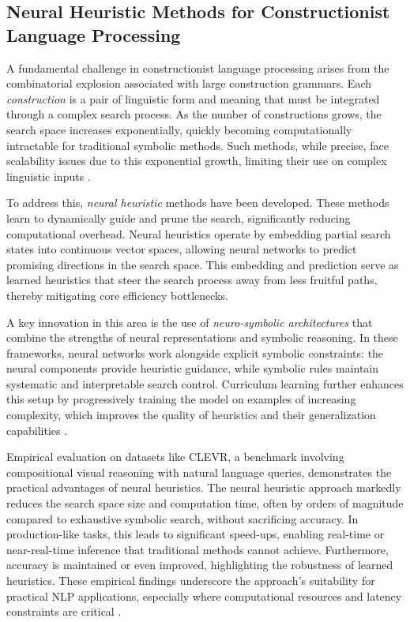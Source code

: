 \documentclass[sigconf]{acmart}
\begin{document}
\subsection{Neural Heuristic Methods for Constructionist Language Processing}

A fundamental challenge in constructionist language processing arises from the combinatorial explosion associated with large construction grammars. Each \emph{construction} is a pair of linguistic form and meaning that must be integrated through a complex search process. As the number of constructions grows, the search space increases exponentially, quickly becoming computationally intractable for traditional symbolic methods. Such methods, while precise, face scalability issues due to this exponential growth, limiting their use on complex linguistic inputs \cite{ref40}.

To address this, \emph{neural heuristic} methods have been developed. These methods learn to dynamically guide and prune the search, significantly reducing computational overhead. Neural heuristics operate by embedding partial search states into continuous vector spaces, allowing neural networks to predict promising directions in the search space. This embedding and prediction serve as learned heuristics that steer the search process away from less fruitful paths, thereby mitigating core efficiency bottlenecks.

A key innovation in this area is the use of \emph{neuro-symbolic architectures} that combine the strengths of neural representations and symbolic reasoning. In these frameworks, neural networks work alongside explicit symbolic constraints: the neural components provide heuristic guidance, while symbolic rules maintain systematic and interpretable search control. Curriculum learning further enhances this setup by progressively training the model on examples of increasing complexity, which improves the quality of heuristics and their generalization capabilities \cite{ref40}.

Empirical evaluation on datasets like CLEVR, a benchmark involving compositional visual reasoning with natural language queries, demonstrates the practical advantages of neural heuristics. The neural heuristic approach markedly reduces the search space size and computation time, often by orders of magnitude compared to exhaustive symbolic search, without sacrificing accuracy. In production-like tasks, this leads to significant speed-ups, enabling real-time or near-real-time inference that traditional methods cannot achieve. Furthermore, accuracy is maintained or even improved, highlighting the robustness of learned heuristics. These empirical findings underscore the approach's suitability for practical NLP applications, especially where computational resources and latency constraints are critical \cite{ref40}.
\end{document}
